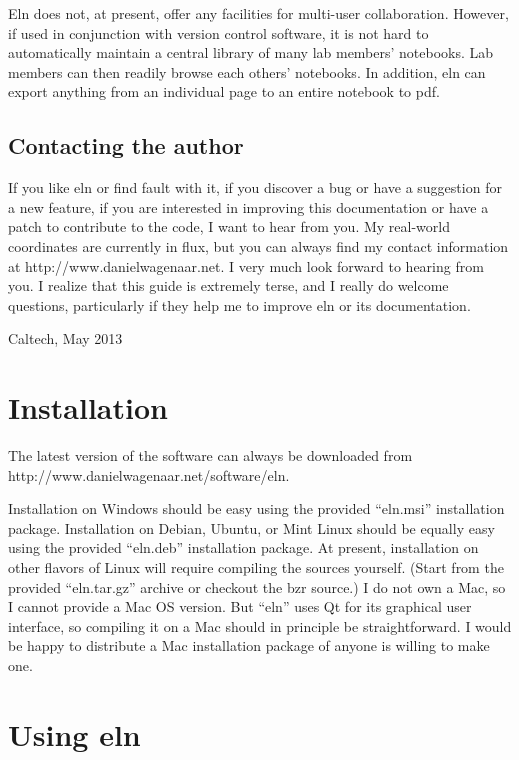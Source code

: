 \documentclass[11pt]{report}
\begin{document}
Eln does not, at present, offer any facilities for multi-user
collaboration. However, if used in conjunction with version control
software, it is not hard to automatically maintain a central library of
many lab members' notebooks. Lab members can then readily browse each
others' notebooks. In addition, eln can export anything from an
individual page to an entire notebook to pdf.

\section{Contacting the author}

If you like eln or find fault with it, if you discover a bug or have a
suggestion for a new feature, if you are interested in improving this
documentation or have a patch to contribute to the code, I want to
hear from you. My real-world coordinates are currently in flux, but
you can always find my contact information at
http://www.danielwagenaar.net. I very much look forward to hearing
from you. I realize that this guide is extremely terse, and I
really do welcome questions, particularly if they help me to improve
eln or its documentation.\medskip

\noindent Caltech, May 2013

\chapter{Installation}

The latest version of the software can always be downloaded from
http://www.danielwagenaar.net/software/eln.

Installation on Windows should be easy using the provided ``eln.msi''
installation package. Installation on Debian, Ubuntu, or Mint Linux
should be equally easy using the provided ``eln.deb'' installation
package. At present, installation on other flavors of Linux will
require compiling the sources yourself. (Start from the provided
``eln.tar.gz'' archive or checkout the bzr source.) I do not own a
Mac, so I cannot provide a Mac OS version. But ``eln'' uses Qt for its
graphical user interface, so compiling it on a Mac should in principle
be straightforward. I would be happy to distribute a Mac installation
package of anyone is willing to make one.

\chapter{Using eln}
\end{document}
